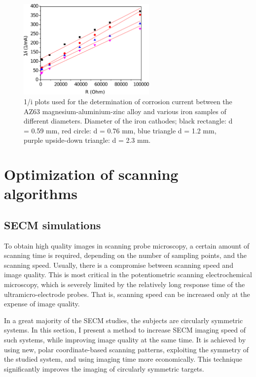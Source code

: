 \begin{figure}
\centering
\includegraphics[width=0.6\textwidth]{img/corrosion_current_measurements.eps} 
\caption[1/i plots used for the determination of corrosion current between the AZ63 magnesium-aluminium-zinc alloy and various iron samples of different diameters.]{1/i plots used for the determination of corrosion current between the AZ63 magnesium-aluminium-zinc alloy and various iron samples of different diameters.
Diameter of the iron cathodes; black rectangle: d = 0.59 mm, red circle: d = 0.76 mm, blue triangle d = 1.2 mm, purple upside-down triangle: d = 2.3 mm.}
\label{fig:corrosion_current_measurements}
\end{figure}

	\newpage
	\section{Optimization of scanning algorithms}
	\label{patterns_result}
		\subsection{SECM simulations}
To obtain high quality images in scanning probe microscopy, a certain amount of scanning time is required, depending on the number of sampling points, and the scanning speed.
Usually, there is a compromise between scanning speed and image quality.
This is most critical in the potentiometric scanning electrochemical microscopy, which is severely limited by the relatively long response time of the ultramicro-electrode probes.
That is, scanning speed can be increased only at the expense of image quality.

In a great majority of the SECM studies, the subjects are circularly symmetric systems.
In this section, I present a method to increase SECM imaging speed of such systems, while improving image quality at the same time.
It is achieved by using new, polar coordinate-based scanning patterns, exploiting the symmetry of the studied system, and using imaging time more economically.
This technique significantly improves the imaging of circularly symmetric targets.

